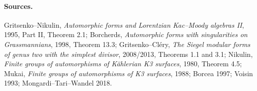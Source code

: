 \paragraph{Sources.}
Gritsenko--Nikulin, \emph{Automorphic forms and Lorentzian
Kac--Moody algebras II}, 1995, Part II, Theorem 2.1; Borcherds,
\emph{Automorphic forms with singularities on Grassmannians}, 1998,
Theorem 13.3; Gritsenko--Cl\'ery, \emph{The Siegel modular forms of
genus two with the simplest divisor}, 2008/2013, Theorems 1.1 and 3.1;
Nikulin, \emph{Finite groups of automorphisms of K\"ahlerian K3
surfaces}, 1980, Theorem 4.5; Mukai, \emph{Finite groups of
automorphisms of K3 surfaces}, 1988; Borcea 1997; Voisin 1993;
Mongardi--Tari--Wandel 2018.
